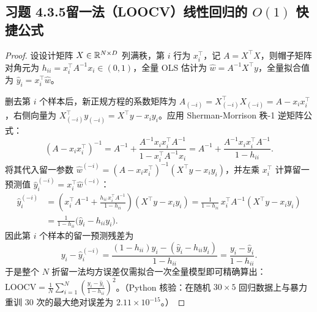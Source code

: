 \subsection*{习题 4.3.5\quad 留一法（LOOCV）线性回归的 $O(1)$ 快捷公式}
\begin{proof}
设设计矩阵 $X \in \mathbb{R}^{N\times D}$ 列满秩，第 $i$ 行为 $x_i^\top$，记 $A = X^\top X$，则帽子矩阵对角元为 $h_{ii} = x_i^\top A^{-1} x_i \in (0, 1)$，全量 OLS 估计为 $\hat{w} = A^{-1} X^\top y$，全量拟合值为 $\hat{y}_i = x_i^\top \hat{w}$。

删去第 $i$ 个样本后，新正规方程的系数矩阵为 $A_{(-i)} = X_{(-i)}^\top X_{(-i)} = A - x_i x_i^\top$，右侧向量为 $X_{(-i)}^\top y_{(-i)} = X^\top y - x_i y_i$。应用 Sherman-Morrison 秩-1 逆矩阵公式：
\[
  (A - x_i x_i^\top)^{-1} = A^{-1} + \frac{A^{-1} x_i x_i^\top A^{-1}}{1 - x_i^\top A^{-1} x_i}
  = A^{-1} + \frac{A^{-1} x_i x_i^\top A^{-1}}{1 - h_{ii}}.
\]
将其代入留一参数 $\hat{w}^{(-i)} = (A - x_i x_i^\top)^{-1}(X^\top y - x_i y_i)$，并左乘 $x_i^\top$ 计算留一预测值 $\hat{y}_i^{(-i)} = x_i^\top \hat{w}^{(-i)}$：
\begin{align*}
  \hat{y}_i^{(-i)}
  &= \left(x_i^\top A^{-1} + \frac{h_{ii}\, x_i^\top A^{-1}}{1 - h_{ii}}\right)(X^\top y - x_i y_i)
   = \frac{1}{1 - h_{ii}}\, x_i^\top A^{-1}(X^\top y - x_i y_i) \\
  &= \frac{1}{1 - h_{ii}}\big(\hat{y}_i - h_{ii} y_i\big).
\end{align*}
因此第 $i$ 个样本的留一预测残差为
\[
  y_i - \hat{y}_i^{(-i)}
  = \frac{(1 - h_{ii}) y_i - (\hat{y}_i - h_{ii} y_i)}{1 - h_{ii}}
  = \frac{y_i - \hat{y}_i}{1 - h_{ii}}.
\]
于是整个 $N$ 折留一法均方误差仅需拟合一次全量模型即可精确算出：$\mathrm{LOOCV} = \frac{1}{N}\sum_{i=1}^N \left(\frac{y_i - \hat{y}_i}{1 - h_{ii}}\right)^2$。（Python 核验：在随机 $30\times 5$ 回归数据上与暴力重训 30 次的最大绝对误差为 $2.11\times 10^{-15}$。）
\end{proof}

